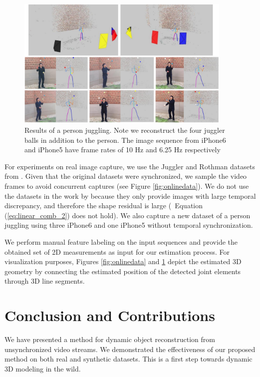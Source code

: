 \begin{figure}
\centering
\includegraphics[width=0.92\textwidth]{chapter5/resource/3_pdfsam_image_cropped.pdf}
\caption[Example output of one real dataset.]{Results of a person juggling. Note we reconstruct the four juggler balls in addition to the person. The image sequence from iPhone6 and iPhone5 have frame rates of 10 Hz and 6.25 Hz respectively}
\label{fig:juggler2}
\end{figure}
For experiments on real image capture, we use the Juggler and Rothman datasets from \cite{ballan2010unstructured}. Given that the original datasets were synchronized, we sample the video frames to avoid concurrent captures (see Figure \ref{fig:onlinedata}). 
We do not use the datasets in the work by \citet{Basha_ECCV2012,Park_ECCV2010} because they only provide images with large temporal discrepancy, and therefore the shape residual is large (\ie~Equation (\ref{eq:linear_comb_2}) does not hold). We also capture a new dataset of a person juggling using three iPhone6 and one iPhone5 without temporal synchronization. 

We perform manual feature labeling on the input sequences and provide the obtained set of 2D measurements as input for our estimation process.
For visualization purposes, Figures \ref{fig:onlinedata} and \ref{fig:juggler2} depict the estimated 3D geometry by connecting the estimated position of the detected joint elements through 3D line segments. 


\section{Conclusion and Contributions} \label{sec:conclusion_l1}
We have presented a method for dynamic object reconstruction from unsynchronized video streams. 
We demonstrated the effectiveness of our proposed method on both real and synthetic datasets.   This is a first step towards dynamic 3D modeling in the wild.

